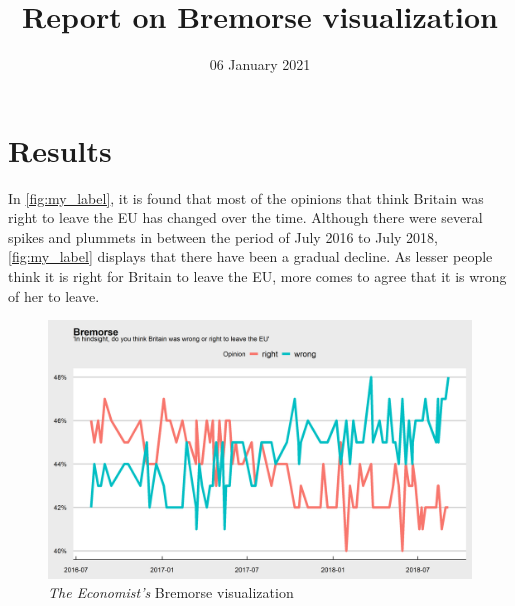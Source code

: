 \documentclass[a4paper,11pt]{article}
\title{Report on Bremorse visualization}
\author{}
\date{06 January 2021}
\begin{document}
\maketitle

\section{Results}

In \autoref{fig:my_label}, it is found that most of the opinions that think Britain was right to leave the EU has changed over the time. Although there were several spikes and plummets in between the period of July 2016 to July 2018, \autoref{fig:my_label} displays that there have been a gradual decline. As lesser people think it is right for Britain to leave the EU, more comes to agree that it is wrong of her to leave. 

\begin{figure}[h]
    \centering
    \includegraphics[width = \textwidth]{Bremorse_graph.png}
    \caption{\emph{The Economist's} Bremorse visualization}
    \label{fig:my_label}
\end{figure}
\end{document}
